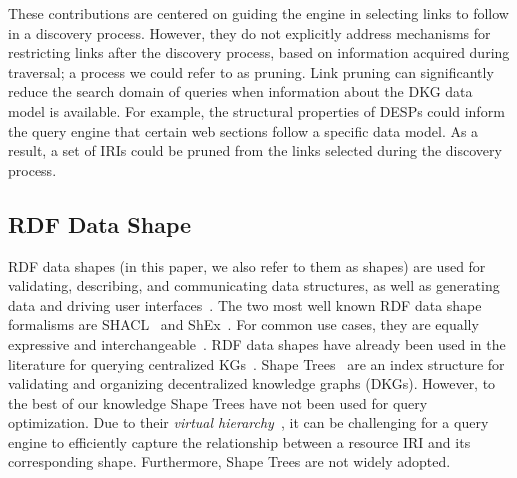 These contributions are centered on guiding the engine in selecting links to follow in a discovery process.
However, they do not explicitly address mechanisms for restricting links after the discovery process, based on information acquired during traversal; a process we could refer to as pruning.
Link pruning can significantly reduce the search domain of queries when information about the DKG data model is available.
For example, the structural properties of DESPs could inform the query engine that certain web sections follow a specific data model. 
As a result, a set of IRIs could be pruned from the links selected during the discovery process.

\subsection{RDF Data Shape}
RDF data shapes (in this paper, we also refer to them as shapes) are used for validating, describing, and communicating data structures, as well as generating data and driving user interfaces~\cite{Gayo2018a,Gayo2018}.
The two most well known RDF data shape formalisms are SHACL~\cite{Gayo2018b} and ShEx~\cite{Gayo2018}.
For common use cases, they are equally expressive and interchangeable~\cite{Gayo2018c}.
RDF data shapes have already been used in the literature for querying centralized KGs~\cite{kashif2021}.
Shape Trees~\cite{shapetreesShapeTrees} are an index structure for validating and organizing decentralized knowledge graphs (DKGs).
However, to the best of our knowledge Shape Trees have not been used for query optimization. 
Due to their \emph{virtual hierarchy}~\cite{shapetreesShapeTrees}, it can be challenging for a query engine to efficiently capture the relationship between a resource IRI and its corresponding shape.
Furthermore, Shape Trees are not widely adopted.

